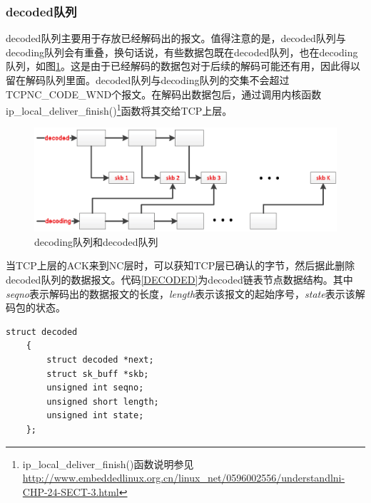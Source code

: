 \subsubsection{\textbf{decoded队列}}
decoded队列主要用于存放已经解码出的报文。值得注意的是，decoded队列与decoding队列会有重叠，换句话说，有些数据包既在decoded队列，也在decoding队列，如图\ref{DECODED_EPS}。这是由于已经解码的数据包对于后续的解码可能还有用，因此得以留在解码队列里面。decoded队列与decoding队列的交集不会超过TCPNC\_CODE\_WND个报文。在解码出数据包后，通过调用内核函数ip\_local\_deliver\_finish()\footnote{ip\_local\_deliver\_finish()函数说明参见\url{http://www.embeddedlinux.org.cn/linux_net/0596002556/understandlni-CHP-24-SECT-3.html}}函数将其交给TCP上层。
\begin{figure}[htbp]
	\centering
	\includegraphics[width=5in]{figures/decoded.eps}
	\caption{decoding队列和decoded队列}
	\label{DECODED_EPS}
\end{figure}
当TCP上层的ACK来到NC层时，可以获知TCP层已确认的字节，然后据此删除decoded队列的数据报文。代码\ref{DECODED}为decoded链表节点数据结构。其中\emph{seqno}表示解码出的数据报文的长度，\emph{length}表示该报文的起始序号，\emph{state}表示该解码包的状态。
	\begin{lstlisting}[float,caption=decoded链表节点数据结构,label={DECODED},language={[ANSI]C}]
	struct decoded
	{
		struct decoded *next;
		struct sk_buff *skb;
		unsigned int seqno;
		unsigned short length;
		unsigned int state;
	};
	\end{lstlisting}
